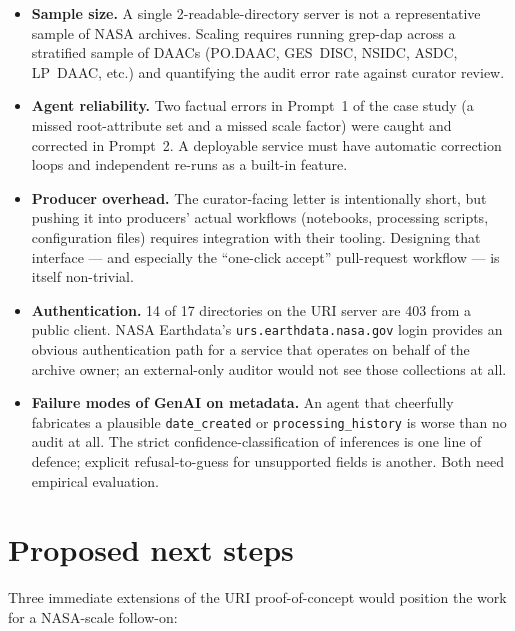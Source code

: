 \documentclass[11pt]{article}
\begin{document}
\begin{itemize}[topsep=2pt]
  \item \textbf{Sample size.} A single 2-readable-directory server
    is not a representative sample of NASA archives. Scaling
    requires running grep-dap across a stratified sample of DAACs
    (PO.DAAC, GES~DISC, NSIDC, ASDC, LP~DAAC, etc.) and
    quantifying the audit error rate against curator review.
  \item \textbf{Agent reliability.} Two factual errors in Prompt~1
    of the case study (a missed root-attribute set and a missed
    scale factor) were caught and corrected in Prompt~2. A
    deployable service must have automatic correction loops and
    independent re-runs as a built-in feature.
  \item \textbf{Producer overhead.} The curator-facing letter is
    intentionally short, but pushing it into producers' actual
    workflows (notebooks, processing scripts, configuration
    files) requires integration with their tooling. Designing
    that interface --- and especially the ``one-click accept''
    pull-request workflow --- is itself non-trivial.
  \item \textbf{Authentication.} 14 of 17 directories on the URI
    server are 403 from a public client. NASA Earthdata's
    \texttt{urs.earthdata.nasa.gov} login provides an obvious
    authentication path for a service that operates on behalf of
    the archive owner; an external-only auditor would not see
    those collections at all.
  \item \textbf{Failure modes of GenAI on metadata.} An agent that
    cheerfully fabricates a plausible \texttt{date\_created} or
    \texttt{processing\_history} is worse than no audit at all.
    The strict confidence-classification of inferences is one
    line of defence; explicit refusal-to-guess for unsupported
    fields is another. Both need empirical evaluation.
\end{itemize}

\section{Proposed next steps}\label{sec:next}

Three immediate extensions of the URI proof-of-concept would
position the work for a NASA-scale follow-on:
\end{document}
